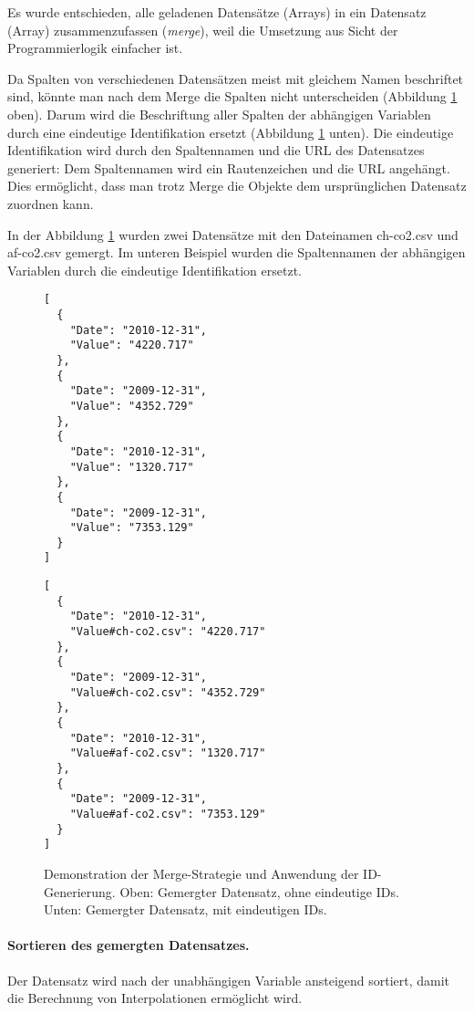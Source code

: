 Es wurde entschieden, alle geladenen Datensätze (Arrays) in ein Datensatz (Array) zusammenzufassen (\textit{merge}), weil die Umsetzung aus Sicht der Programmierlogik einfacher ist. 

Da Spalten von verschiedenen Datensätzen meist mit gleichem Namen beschriftet sind, könnte man nach dem Merge die Spalten nicht unterscheiden (Abbildung \ref{fig:merge} oben). Darum wird die Beschriftung aller Spalten der abhängigen Variablen durch eine eindeutige Identifikation ersetzt (Abbildung \ref{fig:merge} unten). Die eindeutige Identifikation wird durch den Spaltennamen und die URL des Datensatzes generiert: Dem Spaltennamen wird ein Rautenzeichen und die URL angehängt. Dies ermöglicht, dass man trotz Merge die Objekte dem ursprünglichen Datensatz zuordnen kann.

In der Abbildung \ref{fig:merge} wurden zwei Datensätze mit den Dateinamen ch-co2.csv und af-co2.csv gemergt. Im unteren Beispiel wurden die Spaltennamen der abhängigen Variablen durch die eindeutige Identifikation ersetzt.

\begin{figure}[!htbp]
	\centering
	\begin{minipage}{0.40\textwidth}
		\centering
		\begin{verbatim}
[
  {
    "Date": "2010-12-31",
    "Value": "4220.717"
  },
  {
    "Date": "2009-12-31",
    "Value": "4352.729"
  },
  {
    "Date": "2010-12-31",
    "Value": "1320.717"
  },
  {
    "Date": "2009-12-31",
    "Value": "7353.129"
  }
]
		\end{verbatim}
	\end{minipage}\hfill
	\begin{minipage}{0.5\textwidth}
		\centering
		\begin{verbatim}
[
  {
    "Date": "2010-12-31",
    "Value#ch-co2.csv": "4220.717"
  },
  {
    "Date": "2009-12-31",
    "Value#ch-co2.csv": "4352.729"
  },
  {
    "Date": "2010-12-31",
    "Value#af-co2.csv": "1320.717"
  },
  {
    "Date": "2009-12-31",
    "Value#af-co2.csv": "7353.129"
  }
]
		\end{verbatim}
	\end{minipage}
	\caption[Merge-Strategie]{Demonstration der Merge-Strategie und Anwendung der ID-Generierung. Oben: Gemergter Datensatz, ohne eindeutige IDs. Unten: Gemergter Datensatz, mit eindeutigen IDs.}
	\label{fig:merge}
\end{figure}

\paragraph{Sortieren des gemergten Datensatzes.} Der Datensatz wird nach der unabhängigen Variable ansteigend sortiert, damit die Berechnung von Interpolationen ermöglicht wird.


